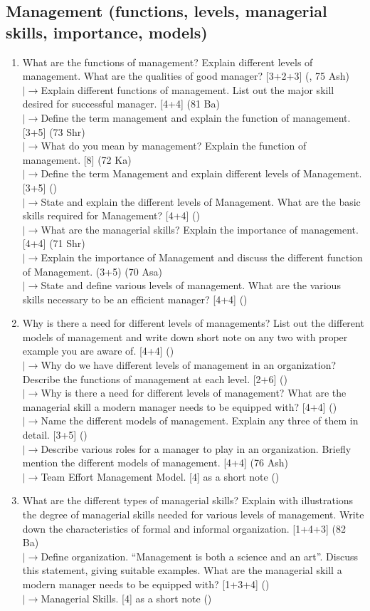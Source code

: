 \documentclass[12pt]{article}
\newcommand{\lb}{\\$\left|\rightarrow\right.$}
\begin{document}
  \subsection{Management (functions, levels, managerial skills, importance, models)}
    \begin{enumerate}[topsep=0pt, noitemsep]
      \item What are the functions of management? Explain different levels of management. What are the qualities of good manager? \hfill [3+2+3] (, 75 Ash)
        \lb Explain different functions of management. List out the major skill desired for successful manager. \hfill [4+4] (81 Ba)
        \lb Define the term management and explain the function of management. \hfill [3+5] (73 Shr)
        \lb What do you mean by management? Explain the function of management. \hfill [8] (72 Ka)
        \lb Define the term Management and explain different levels of Management. \hfill [3+5] ()
        \lb State and explain the different levels of Management. What are the basic skills required for Management? \hfill [4+4] ()
        \lb What are the managerial skills? Explain the importance of management. \hfill [4+4] (71 Shr)
        \lb Explain the importance of Management and discuss the different function of Management. \hfill (3+5) (70 Asa)
        \lb State and define various levels of management. What are the various skills necessary to be an efficient manager? \hfill [4+4] ()

      \item Why is there a need for different levels of managements? List out the different models of management and write down short note on any two with proper example you are aware of. \hfill [4+4] ()
        \lb Why do we have different levels of management in an organization? Describe the functions of management at each level. \hfill [2+6] ()
        \lb Why is there a need for different levels of management? What are the managerial skill a modern manager needs to be equipped with? \hfill [4+4] ()
        \lb Name the different models of management. Explain any three of them in detail. \hfill [3+5] ()
        \lb Describe various roles for a manager to play in an organization. Briefly mention the different models of management. \hfill [4+4] (76 Ash)
        \lb Team Effort Management Model. \hfill [4] as a short note ()

      \item What are the different types of managerial skills? Explain with illustrations the degree of managerial skills needed for various levels of management. Write down the characteristics of formal and informal organization. \hfill [1+4+3] (82 Ba)
        \lb Define organization. ``Management is both a science and an art''. Discuss this statement, giving suitable examples. What are the managerial skill a modern manager needs to be equipped with? \hfill [1+3+4] ()
        \lb Managerial Skills. \hfill [4] as a short note ()


\end{enumerate}
\end{document}
